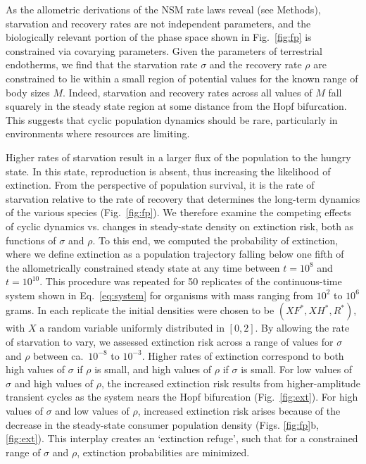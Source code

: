 \documentclass[twocolumn,preprintnumbers,amsmath,amssymb,superscriptaddress]{revtex4}
\begin{document}
As the allometric derivations of the NSM rate laws reveal (see Methods), starvation and recovery rates are not independent parameters, and the biologically relevant portion of the phase space shown in Fig.~\ref{fig:fp} is constrained via covarying parameters.
Given the parameters of terrestrial endotherms, we find that the starvation rate $\sigma$ and the recovery rate $\rho$ are constrained to lie within a small region of potential values for the known range of body sizes $M$.
Indeed, starvation and recovery rates across all values of $M$ fall squarely in the steady state region at some distance from the Hopf bifurcation. 
This suggests that cyclic population dynamics should be rare, particularly in environments where resources are limiting.

Higher rates of starvation result in a larger flux of the population to the hungry state.
In this state, reproduction is absent, thus increasing the likelihood of extinction.  From the perspective of population survival, it is the rate of starvation relative to the rate of recovery that determines the long-term dynamics of the various species (Fig.~\ref{fig:fp}).
We therefore examine the competing effects of cyclic dynamics vs. changes in steady-state density on extinction risk, both as functions of $\sigma$ and $\rho$.
To this end, we computed the probability of extinction, where we define extinction as a population trajectory falling below one fifth of the allometrically constrained steady state at any time between $t=10^8$ and $t=10^{10}$.
This procedure was repeated for 50 replicates of the continuous-time system shown in Eq.~\ref{eq:system} for organisms with mass ranging from $10^2$ to $10^6$ grams.
In each replicate the initial densities were chosen to be $(XF^*,XH^*,R^*)$, with $X$ a random variable uniformly distributed in $[0,2]$.
By allowing the rate of starvation to vary, we assessed extinction risk across a range of values for $\sigma$ and $\rho$ between ca.\ $10^{-8}$ to $10^{-3}$. %
Higher rates of extinction correspond to both high values of $\sigma$ if $\rho$ is small, and high values of $\rho$ if $\sigma$ is small.
For low values of $\sigma$ and high values of $\rho$, the increased extinction risk results from higher-amplitude transient cycles as the system nears the Hopf bifurcation (Fig.~\ref{fig:ext}).
For high values of $\sigma$ and low values of $\rho$, increased extinction risk arises because of the decrease in the steady-state consumer population density (Figs. \ref{fig:fp}b, \ref{fig:ext}).
This interplay creates an `extinction refuge', such that for a constrained range of $\sigma$ and $\rho$, extinction probabilities are minimized.
\end{document}
